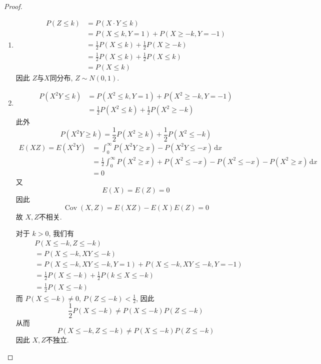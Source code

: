 \documentclass[../main.tex]{subfiles}
\begin{document}
\begin{proof}
  \begin{enumerate}
    \item  \[
   \begin{aligned}
    P\left( Z\le k \right)&= P\left( X\cdot Y\le k \right) \\ 
     &= P\left( X\le k, Y= 1 \right)+ P\left( X\ge -k,Y= -1 \right)\\ 
      &= \frac{1}{2}P\left( X\le k \right)    + \frac{1}{2}P\left( X\ge -k \right) \\ 
       &= \frac{1}{2}P\left( X\le k \right)+ \frac{1}{2}P\left( X\le k \right)\\ 
        &= P\left( X\le k \right)   
   \end{aligned}
    \]因此 \(  Z  \)与\(  X  \)同分布,  \(  Z\sim N\left( 0,1 \right)   \).
    
    \item  \[
    \begin{aligned}
    P\left( X^{2}Y \le k\right)&= P\left( X^{2}\le k, Y= 1 \right)+ P\left( X^{2}\ge -k,Y= -1 \right)    \\ 
     &= \frac{1}{2}P\left( X^{2}\le k \right) + \frac{1}{2}P\left( X^{2}\ge -k \right) 
    \end{aligned}
    \]  此外 \[
    P\left( X^{2}Y\ge k \right)= \frac{1}{2}P\left( X^{2}\ge k \right) + \frac{1}{2}P\left( X^{2}\le -k \right)   
    \]\[
   \begin{aligned}
 E\left( XZ \right)=     E\left( X^{2}Y \right)&= \int_{0}^{\infty}P\left( X^{2}Y\ge x \right)-P\left( X^{2}Y\le -x \right)\,\mathrm{d} x \\ 
     &= \frac{1}{2}\int_{0}^{\infty}P\left( X^{2}\ge x \right)+ P\left( X^{2}\le -x \right)-P\left( X^{2}\le -x \right)-P\left( X^{2}\ge x \right)\,\mathrm{d} x\\ 
      &=     0
   \end{aligned}
    \]  又\[
    E\left( X \right)= E\left( Z \right)= 0  
    \]因此 \[
    \operatorname{Cov}\left( X,Z \right)= E\left( XZ \right)-E\left( X \right)E\left( Z \right)= 0    
    \]故 \(  X,Z  \)不相关.
    
    对于 \(  k> 0  \), 我们有 \[
    \begin{aligned}
    &P\left( X\le -k,Z\le -k \right)\\ 
     &= P\left( X\le -k, XY\le -k \right)\\ 
     &= P\left( X\le -k,XY\le -k,Y= 1 \right)+ P\left( X\le -k,XY\le -k,Y= -1 \right)\\ 
      &=    \frac{1}{2} P\left( X\le -k \right)+\frac{1}{2} P\left( k\le X\le -k \right)\\ 
       &=\frac{1}{2} P\left( X\le -k \right)   
    \end{aligned} 
    \] 而 \(  P\left( X\le -k \right)\neq 0   \), \(  P\left( Z\le -k \right)< \frac{1}{2}   \), 因此 \[
  \frac{1}{2}  P\left( X\le -k \right)\neq P\left( X\le -k \right)P\left( Z\le -k \right)   
    \]  从而 \[
    P\left( X\le -k,Z\le -k \right)\neq P\left( X\le -k \right)P\left( Z\le -k \right)   
    \]因此 \(  X,Z  \)不独立. 
  \end{enumerate}
  
\end{proof}
\end{document}
